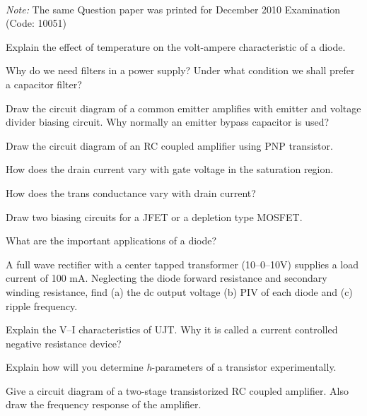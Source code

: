 %
%
%
% 
% 
% 
%
\def \subj{AI09 303---ELECTRONIC CIRCUITS---1}

\sub{\subj}
\maxtime

\\\emph{Note:} The same Question paper was printed for December 2010 Examination (Code: 10051)
\partA

\iitem Explain the effect of temperature on the volt-ampere characteristic of a diode.
\item Why do we need filters in a power supply? Under what condition we shall prefer a capacitor
  filter?
\item Draw the circuit diagram of a common emitter amplifies with emitter and voltage divider
  biasing circuit. Why normally an emitter bypass capacitor is used?
\item Draw the circuit diagram of an RC coupled amplifier using PNP transistor.
\item \iitem How does the drain current vary with gate voltage in the saturation region.
\item How does the trans conductance vary with drain current?
\ene

\markA
\partB

\item Draw two biasing circuits for a JFET or a depletion type MOSFET.
\item What are the important applications of a diode?
\item A full wave rectifier with a center tapped transformer (10--0--10V) supplies a load current
  of 100 mA. Neglecting the diode forward resistance and secondary winding resistance, find (a) the dc
  output voltage (b) PIV of each diode and (c) ripple frequency.
\item Explain the V--I characteristics of UJT. Why it is called a current controlled negative
  resistance device?
\item Explain how will you determine {\em h}-parameters of a transistor experimentally.
\item Give a circuit diagram of a two-stage transistorized RC coupled amplifier. Also draw the frequency
  response of the amplifier.

